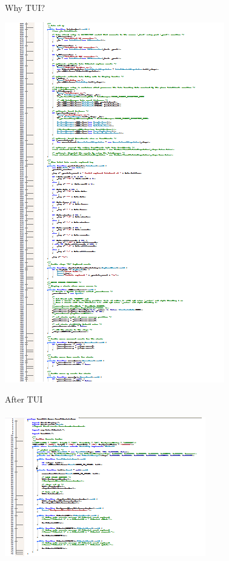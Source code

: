 \begin{frame}
\begin{block}{Why TUI?}
\begin{minipage}{1.0\linewidth}
\begin{center}
\begin{minipage}{.39\linewidth}
\begin{center}
\includegraphics[scale=0.18]{images/old_part2.png}
\end{center}
\end{minipage}%
\begin{minipage}{.59\linewidth}
\begin{center}
After TUI\\$\;$\\
\includegraphics[scale=0.18]{images/new_code.png} 
\end{center}
\end{minipage}
\end{center}
\end{minipage}
\end{block}
\end{frame}

